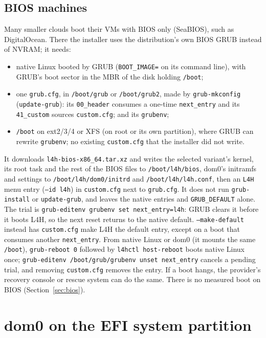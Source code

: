\documentclass[11pt,a4paper]{report}
\newcommand{\cmd}[1]{\texttt{#1}}
\newcommand{\file}[1]{\texttt{#1}}
\begin{document}
\subsection*{BIOS machines}

Many smaller clouds boot their VMs with BIOS only (SeaBIOS), such as
DigitalOcean. There the installer uses the distribution's own BIOS GRUB
instead of NVRAM; it needs:
\begin{itemize}
  \item native Linux booted by GRUB (\texttt{BOOT\_IMAGE=} on its command
        line), with GRUB's boot sector in the MBR of the disk holding
        \file{/boot};
  \item one \file{grub.cfg}, in \file{/boot/grub} or \file{/boot/grub2},
        made by \cmd{grub-mkconfig} (\cmd{update-grub}): its
        \texttt{00\_header} consumes a one-time \texttt{next\_entry}
        and its \texttt{41\_custom} sources \file{custom.cfg}; and its
        \file{grubenv};
  \item \file{/boot} on ext2/3/4 or XFS (on root or its own partition),
        where GRUB can rewrite \file{grubenv}; no existing
        \file{custom.cfg} that the installer did not write.
\end{itemize}
It downloads \file{l4h-bios-x86\_64.tar.xz} and writes the selected
variant's kernel, its root task and the rest of the BIOS files to
\file{/boot/l4h/bios},
dom0's initramfs and settings to \file{/boot/l4h/dom0/initrd} and
\file{/boot/l4h/l4h.conf}, then an \texttt{L4H} menu entry
(\texttt{--id l4h}) in \file{custom.cfg} next to \file{grub.cfg}. It does
not run \cmd{grub-install} or \cmd{update-grub}, and leaves the native
entries and \texttt{GRUB\_DEFAULT} alone. The trial is
\cmd{grub-editenv grubenv set next\_entry=l4h}: GRUB clears it before it
boots L4H, so the next reset returns to the native default.
\texttt{--make-default} instead has \file{custom.cfg} make L4H the default
entry, except on a boot that consumes another \texttt{next\_entry}. From
native Linux or dom0 (it mounts the same \file{/boot}),
\cmd{grub-reboot 0} followed by \cmd{l4hctl host-reboot} boots native
Linux once; \cmd{grub-editenv /boot/grub/grubenv unset next\_entry}
cancels a pending trial, and removing \file{custom.cfg} removes the entry.
If a boot hangs, the provider's recovery console or rescue system can do
the same. There is no measured boot on BIOS (Section~\ref{sec:bios}).

\section{dom0 on the EFI system partition}
\label{sec:esp}
\end{document}
